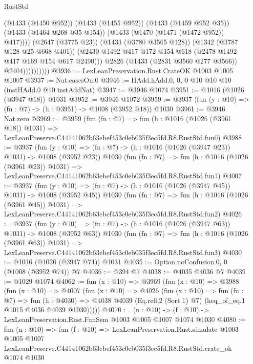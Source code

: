 \begin{lexlean}{RustStd}
\begin{coremodule}
                              (@1433 (@1450 @952))
                              (@1433 (@1455 @952))
                              (@1433 (@1459 @952 @35))
                              (@1433 (@1464 @268 @35 @154))
                              (@1433 (@1470 (@1471 (@1472 @952)) @417))))
                          (@2647 (@3775 @23))
                          (@1433 (@3780 @3565 @128))
                          (@1342 (@3787 @128 @25 @668 @401))
                          (@2430 @1492 @417 @172 @154 @618 (@2478 @1492 @417 @169 @154 @617 @2490)))
                        @2826
                        (@1433 (@2831 @3560 @277 @3566))
                        @2404))))))))))
@3936 := LexLeanPreservation.Rust.CrateOK @1003 @1005 @1007
@3937 := Nat.casesOn.{0}
@3946 := HAdd.hAdd.{0, 0, 0} @10 @10 @10 (instHAdd.{0} @10 instAddNat)
@3947 := @3946 @1074
@3951 := @1016 (@1026 (@3947 @18)) @1031
@3952 := @3946 @1072
@3959 := @3937 (fun (y : @10) => (fn : @7) -> (h : @3951) -> @1008 (@3952 @18)) @1030
@3961 := @3946 Nat.zero
@3969 := @3959
    (fun (fn : @7) =>
    fun (h : @1016 (@1026 (@3961 @18)) @1031) =>
    LexLeanPreserve.C44141062b63ebef453c0eb035f3ec5fd.R8.RustStd.fun0)
@3988 := @3937
    (fun (y : @10) => (fn : @7) -> (h : @1016 (@1026 (@3947 @23)) @1031) -> @1008 (@3952 @23))
    @1030
    (fun (fn : @7) =>
    fun (h : @1016 (@1026 (@3961 @23)) @1031) =>
    LexLeanPreserve.C44141062b63ebef453c0eb035f3ec5fd.R8.RustStd.fun1)
@4007 := @3937
    (fun (y : @10) => (fn : @7) -> (h : @1016 (@1026 (@3947 @45)) @1031) -> @1008 (@3952 @45))
    @1030
    (fun (fn : @7) =>
    fun (h : @1016 (@1026 (@3961 @45)) @1031) =>
    LexLeanPreserve.C44141062b63ebef453c0eb035f3ec5fd.R8.RustStd.fun2)
@4026 := @3937
    (fun (y : @10) => (fn : @7) -> (h : @1016 (@1026 (@3947 @63)) @1031) -> @1008 (@3952 @63))
    @1030
    (fun (fn : @7) =>
    fun (h : @1016 (@1026 (@3961 @63)) @1031) =>
    LexLeanPreserve.C44141062b63ebef453c0eb035f3ec5fd.R8.RustStd.fun3)
@4030 := @1016 (@1026 (@3947 @74)) @1031
@4035 := Option.noConfusion.{0, 0} (@1008 (@3952 @74)) @7
@4036 := @394 @7
@4038 := @4035 @4036 @7
@4039 := @1029 @1074
@4062 := fun (x : @10) =>
  @3969
    (fun (x : @10) =>
    @3988
      (fun (x : @10) =>
      @4007
        (fun (x : @10) =>
        @4026
          (fun (x : @10) =>
          fun (fn : @7) =>
          fun (h : @4030) =>
          @4038 @4039 (Eq.refl.{2} (Sort 1) @7) (heq_of_eq.{1} @1015 @4036 @4039 @1030)))))
@4070 := (n : @10) -> (f : @10) -> LexLeanPreservation.Rust.FunSem @1003 @1005 @1007 @1074 @1030
@4080 := fun (n : @10) =>
  fun (f : @10) =>
  LexLeanPreservation.Rust.simulate
    @1003
    @1005
    @1007
    LexLeanPreserve.C44141062b63ebef453c0eb035f3ec5fd.R8.RustStd.crate_ok
    @1074
    @1030
\end{coremodule}
\end{lexlean}
